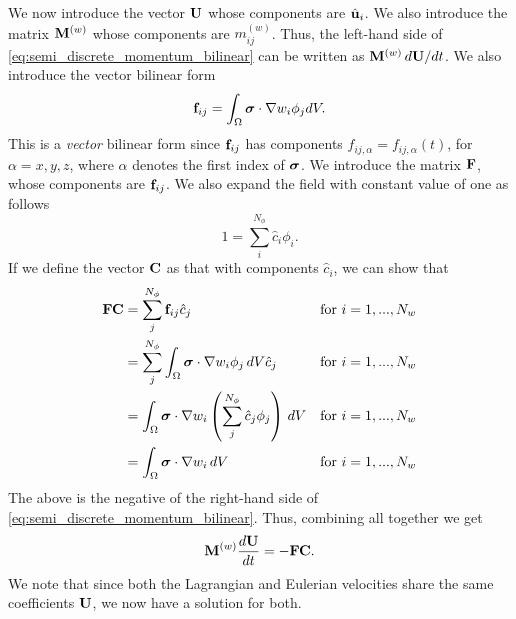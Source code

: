 \documentclass[11pt]{article}
\begin{document}
We now introduce the vector $\mathbf{U}$ whose components are $\hat{\mathbf{u}}_i$. We also introduce the matrix $\mathbf{M}^{(w)}$ whose components are $m_{ij}^{(w)}$. Thus, the left-hand side of \cref{eq:semi_discrete_momentum_bilinear} can be written as $\mathbf{M}^{(w)} \, d\mathbf{U} / dt$.
We also introduce the vector bilinear form
\begin{equation}
    \mathbf{f}_{ij} = \int_\Omega \bm \sigma \cdot \nabla w_i \phi_j dV.
\end{equation}
This is a \textit{vector} bilinear form since $\mathbf{f}_{ij}$ has components $f_{ij,\alpha} = f_{ij,\alpha}(t)$, for $\alpha = x,y,z$, where $\alpha$ denotes the first index of $\bm \sigma$. We introduce the matrix $\mathbf{F}$, whose components are $\mathbf{f}_{ij}$. We also expand the field with constant value of one as follows
\begin{equation}
    1 = \sum_i^{N_\phi} \hat{c}_i \phi_i.
\end{equation}
If we define the vector $\mathbf{C}$ as that with components $\hat{c}_i$, we can show that 
\begin{align}
    \mathbf{F} \mathbf{C} &= \sum_j^{N_\phi} \mathbf{f}_{ij} \hat{c}_j &\text{for } i = 1,...,N_w \nonumber \\
    &= \sum_j^{N_\phi} \int_\Omega \bm \sigma \cdot \nabla w_i \phi_j \, dV \hat{c}_j &\text{for } i = 1,...,N_w \nonumber \\
    &= \int_\Omega \bm \sigma \cdot \nabla w_i \left ( \sum_j^{N_\phi} \hat{c}_j \phi_j \right ) \, dV &\text{for } i = 1,...,N_w \nonumber \\
    &= \int_\Omega \bm \sigma \cdot \nabla w_i \, dV &\text{for } i = 1,...,N_w
\end{align}
The above is the negative of the right-hand side of \cref{eq:semi_discrete_momentum_bilinear}. Thus, combining all together we get
\begin{equation}
    \mathbf{M}^{(w)} \frac{d\mathbf{U}}{dt} = -\mathbf{F} \mathbf{C}.
\end{equation}
We note that since both the Lagrangian and Eulerian velocities share the same coefficients $\mathbf{U}$, we now have a solution for both.

\end{document}
